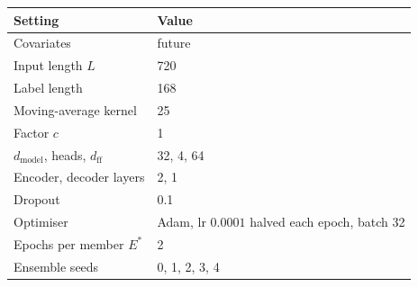 \begin{tabular}{ll}
\toprule
\textbf{Setting} & \textbf{Value} \\
\midrule
Covariates & future \\
Input length $L$ & 720 \\
Label length & 168 \\
Moving-average kernel & 25 \\
Factor $c$ & 1 \\
$d_{\text{model}}$, heads, $d_{\text{ff}}$ & 32, 4, 64 \\
Encoder, decoder layers & 2, 1 \\
Dropout & 0.1 \\
Optimiser & Adam, lr $0.0001$ halved each epoch, batch 32 \\
Epochs per member $E^{*}$ & 2 \\
Ensemble seeds & 0, 1, 2, 3, 4 \\
\bottomrule
\end{tabular}
